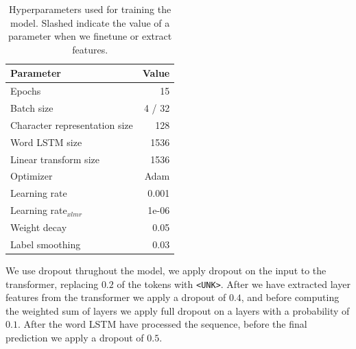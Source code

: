 \documentclass[11pt]{article}
\begin{document}
   
	\begin{table}[h]
		\centering
		\begin{tabular}{lr}
			Parameter & Value \\
			\hline
			Epochs & 15 \\
			Batch size & 4 / 32 \\
			Character representation size & 128 \\
            Word LSTM size & 1536 \\
            Linear transform size & 1536 \\
			Optimizer & Adam \\
			Learning rate & 0.001 \\
			Learning rate$_{xlmr}$ & 1e-06 \\
            Weight decay & 0.05 \\
			Label smoothing & 0.03 \\
		\end{tabular}
		\caption{\label{tab:parameters} Hyperparameters used for training the model. Slashed indicate the value of a parameter when we finetune or extract features.}
	\end{table}

        We use dropout thrughout the model, we apply dropout on the
     input to the transformer, replacing $0.2$ of the tokens with
     \texttt{<UNK>}. After we have extracted layer features from the
     transformer we apply a dropout of $0.4$, and before computing the
     weighted sum of layers we apply full dropout on a layers with a
     probability of $0.1$. After the word LSTM have processed the
     sequence, before the final prediction we apply a dropout of
     $0.5$.
\end{document}

